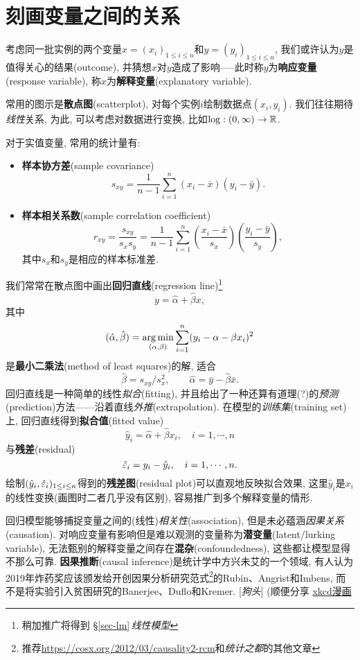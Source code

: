 \section{刻画变量之间的关系}
考虑同一批实例的两个变量$x = (x_{i})_{1\leq i\leq n}$和$y = (y_{i})_{1\leq i\leq n}$, 我们或许认为$y$是值得关心的结果(outcome), 并猜想$x$对$y$造成了影响-----此时称$y$为\textbf{响应变量}(response variable), 称$x$为\textbf{解释变量}(explanatory variable).

常用的图示是\textbf{散点图}(scatterplot), 对每个实例$i$绘制数据点$(x_{i},y_{i})$. 我们往往期待\emph{线性}关系, 为此, 可以考虑对数据进行变换, 比如$\log : (0,\infty) \to \mathbb{R}$.

对于实值变量, 常用的统计量有:
\begin{itemize}
    \item \textbf{样本协方差}(sample covariance)
          \[ s_{xy} = \frac{1}{n-1}\sum_{i=1}^{n}(x_{i}-\bar{x})(y_{i}-\bar{y}). \]
    \item \textbf{样本相关系数}(sample correlation coefficient)
          \[ r_{xy} = \frac{s_{xy}}{s_{x}s_{y}} = \frac{1}{n-1}\sum_{i=1}^{n}\left(\frac{x_{i}-\bar{x}}{s_{x}}\right)\left(\frac{y_{i}-\bar{y}}{s_{y}}\right), \]
          其中$s_{x}$和$s_{y}$是相应的样本标准差.
\end{itemize}

我们常常在散点图中画出\textbf{回归直线}(regression line)\footnote{稍加推广将得到 \S\ref{sec-lm}\,\emph{线性模型}}
\[ y = \hat{\alpha} + \hat{\beta}x, \]
其中
\[ (\hat{\alpha},\hat{\beta}) = \argmin_{(\alpha,\beta)} \sum_{i=1}^{n} (y_{i} -\alpha -\beta x_{i})^{2} \]
是\textbf{最小二乘法}(method of least squares)的解, 适合
\[ \hat{\beta} = s_{xy}/s_{x}^{2}, \qquad \hat{\alpha} = \bar{y}-\hat{\beta}\bar{x}. \]
回归直线是一种简单的线性\emph{拟合}(fitting), 并且给出了一种还算有道理(?)的\emph{预测}(prediction)方法------沿着直线\emph{外推}(extrapolation). 在模型的\emph{训练集}(training set)上, 回归直线得到\textbf{拟合值}(fitted value)
\[ \hat{y}_{i} = \hat{\alpha}+\hat{\beta}x_{i}, \quad i=1,\cdots,n \]
与\textbf{残差}(residual)
\[ \hat{\varepsilon}_{i} = y_{i}-\hat{y}_{i}, \quad i=1,\cdots,n. \]
绘制$(\hat{y}_{i},\hat{\varepsilon}_{i})_{1\leq i\leq n}$得到的\textbf{残差图}(residual plot)可以直观地反映拟合效果, 这里$\hat{y}_{i}$是$x_{i}$的线性变换(画图时二者几乎没有区别), 容易推广到多个解释变量的情形.

回归模型能够捕捉变量之间的(线性)\emph{相关性}(association), 但是未必蕴涵\emph{因果关系}(causation). 对响应变量有影响但是难以观测的变量称为\textbf{潜变量}(latent/lurking variable), 无法甄别的解释变量之间存在\textbf{混杂}(confoundedness), 这些都让模型显得不那么可靠. \textbf{因果推断}(causal inference)是统计学中方兴未艾的一个领域, 有人认为2019年炸药奖应该颁发给开创因果分析研究范式\footnote{推荐\url{https://cosx.org/2012/03/causality2-rcm}和\emph{统计之都}的其他文章}的Rubin、Angrist和Imbens, 而不是将实验引入贫困研究的Banerjee、Duflo和Kremer. [\textit{狗头}]
\hfill  (顺便分享 \href{https://xkcd.com/552}{xkcd漫画}


